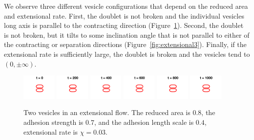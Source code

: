\documentclass[aps,prl,twocolumn,showpacs,amsmath,amssymb]{revtex4-1}
\begin{document}
We observe three different vesicle configurations that depend on the
reduced area and extensional rate.  First, the doublet is not broken and
the individual vesicles long axis is parallel to the contracting
direction (Figure~\ref{fig:extensional1}).  Second, the doublet is not
broken, but it tilts to some inclination angle that is not parallel to
either of the contracting or separation directions
(Figure~\ref{fig:extensional3}).  Finally, if the extensional rate is
sufficiently large, the doublet is broken and the vesicles tend to
$(0,\pm \infty)$.


\begin{figure}[htp]
  \includegraphics[width = 0.15\textwidth]{figs/extensional_adR4em1adS7em1Chi3em2_ra080_image01.png}
  \includegraphics[width = 0.15\textwidth]{figs/extensional_adR4em1adS7em1Chi3em2_ra080_image02.png}
  \includegraphics[width = 0.15\textwidth]{figs/extensional_adR4em1adS7em1Chi3em2_ra080_image03.png}
  \includegraphics[width = 0.15\textwidth]{figs/extensional_adR4em1adS7em1Chi3em2_ra080_image04.png}
  \includegraphics[width = 0.15\textwidth]{figs/extensional_adR4em1adS7em1Chi3em2_ra080_image05.png}
  \includegraphics[width = 0.15\textwidth]{figs/extensional_adR4em1adS7em1Chi3em2_ra080_image06.png}
  \caption{\label{fig:extensional1} Two vesicles in an extensional flow.
  The reduced area is $0.8$, the adhesion strength is $0.7$, and the
  adhesion length scale is $0.4$, extensional rate is $\chi = 0.03$.}
\end{figure}
\end{document}
